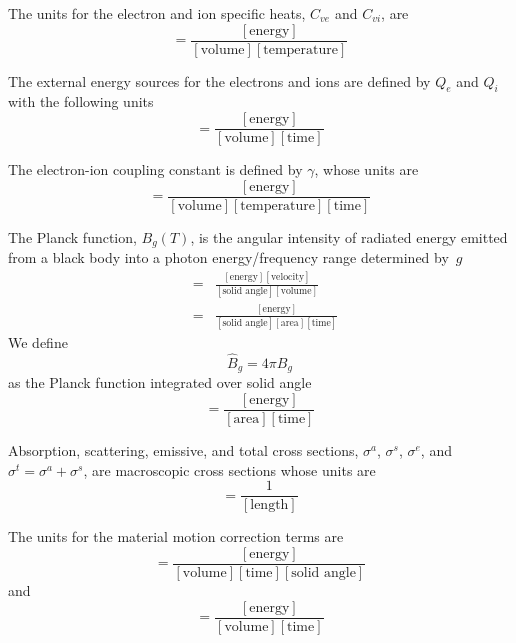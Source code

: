 \documentclass{article}
\newcommand{\Bg}{\ensuremath{\hat{B}_{g}}}
\newcommand{\units}[1]{\ensuremath{[\mbox{#1}]}}
\begin{document}
The units for the electron and ion specific heats, $C_{ve}$ and $C_{vi}$, are 
\begin{equation}
        [C_{v}] = \frac{\units{energy}}{\units{volume}\units{temperature}}
\end{equation}

The external energy sources for the electrons and ions are defined by
$Q_{e}$ and $Q_{i}$ with the following units
\begin{equation}
        [Q] = \frac{\units{energy}}{\units{volume}\units{time}}
\end{equation}

The electron-ion coupling constant is defined by $\gamma$, whose units are
\begin{equation}
        [\gamma] = \frac{\units{energy}}{\units{volume}\units{temperature}
                                         \units{time}}
\end{equation}

The Planck function, $B_{g}(T)$, is the angular intensity
of radiated energy emitted from a 
black body into a photon energy/frequency range determined by~$g$
\begin{eqnarray}
        [B_{g}] &=& \frac{\units{energy} \units{velocity}}
                         {\units{solid angle} \units{volume}} \\
                &=& \frac{\units{energy}}
                         {\units{solid angle} \units{area} \units{time}}
\end{eqnarray}
We define
\begin{equation}
   \Bg = 4\pi B_{g}
\end{equation}
 as the Planck function integrated over solid angle
\begin{equation}
        [\Bg] = \frac{\units{energy}}
                     {\units{area} \units{time}}
\end{equation}

Absorption, scattering, emissive, and total cross sections, $\sigma^{a}$,
$\sigma^{s}$, $\sigma^{e}$, and $\sigma^{t} = \sigma^{a} + \sigma^{s}$,
are macroscopic cross sections whose units are
\begin{equation}
        [\sigma] = \frac{1}{\units{length}}
\end{equation}

The units for the material motion correction terms are
\begin{equation}
        [\xi] = \frac{\units{energy}}
                     {\units{volume} \units{time} \units{solid angle}}
\end{equation}
and
\begin{equation}
        [\tilde{\xi}] = \frac{\units{energy}}
                             {\units{volume} \units{time}}
\end{equation}
\end{document}
